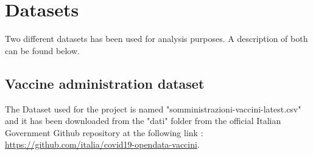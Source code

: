 \documentclass{article}
\begin{document}

\hfill\break
\newpage

\newpage
\section{Datasets}
Two different datasets has been used for analysis purposes. A description of both can be found below.
\subsection{Vaccine administration dataset}
The Dataset used for the project is named {\selectfont"somministrazioni-vaccini-latest.csv"} and it has been downloaded from the {\selectfont"dati"} folder from the official Italian Government Github repository at the following link :\\ \url{https://github.com/italia/covid19-opendata-vaccini}.
\end{document}
